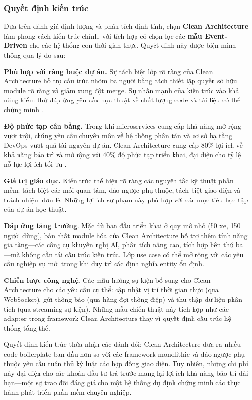 \subsubsection{Quyết định kiến trúc}

Dựa trên đánh giá định lượng và phân tích định tính, chọn \textbf{Clean Architecture} làm phong cách kiến trúc chính, với tích hợp có chọn lọc các \textbf{mẫu Event-Driven} cho các hệ thống con thời gian thực. Quyết định này được biện minh thông qua lý do sau:

\textbf{Phù hợp với ràng buộc dự án.} Sự tách biệt lớp rõ ràng của Clean Architecture hỗ trợ cấu trúc nhóm ba người bằng cách thiết lập quyền sở hữu module rõ ràng và giảm xung đột merge. Sự nhấn mạnh của kiến trúc vào khả năng kiểm thử đáp ứng yêu cầu học thuật về chất lượng code và tài liệu có thể chứng minh \cite{martin2017}.

\textbf{Độ phức tạp cân bằng.} Trong khi microservices cung cấp khả năng mở rộng vượt trội, chúng yêu cầu chuyên môn về hệ thống phân tán và cơ sở hạ tầng DevOps vượt quá tài nguyên dự án. Clean Architecture cung cấp 80\% lợi ích về khả năng bảo trì và mở rộng với 40\% độ phức tạp triển khai, đại diện cho tỷ lệ nỗ lực-lợi ích tối ưu \cite{richards2020}.

\textbf{Giá trị giáo dục.} Kiến trúc thể hiện rõ ràng các nguyên tắc kỹ thuật phần mềm: tách biệt các mối quan tâm, đảo ngược phụ thuộc, tách biệt giao diện và trách nhiệm đơn lẻ. Những lợi ích sư phạm này phù hợp với các mục tiêu học tập của dự án học thuật.

\textbf{Đáp ứng tăng trưởng.} Mặc dù ban đầu triển khai ở quy mô nhỏ (50 xe, 150 người dùng), bản chất module hóa của Clean Architecture hỗ trợ thêm tính năng gia tăng—các công cụ khuyến nghị AI, phân tích nâng cao, tích hợp bên thứ ba—mà không cần tái cấu trúc kiến trúc. Lớp use case có thể mở rộng với các yêu cầu nghiệp vụ mới trong khi duy trì các định nghĩa entity ổn định.

\textbf{Chiến lược công nghệ.} Các mẫu hướng sự kiện bổ sung cho Clean Architecture cho các yêu cầu cụ thể: cập nhật vị trí thời gian thực (qua WebSocket), gửi thông báo (qua hàng đợi thông điệp) và thu thập dữ liệu phân tích (qua streaming sự kiện). Những mẫu chiến thuật này tích hợp như các adapter trong framework Clean Architecture thay vì quyết định cấu trúc hệ thống tổng thể.

Quyết định kiến trúc thừa nhận các đánh đổi: Clean Architecture đưa ra nhiều code boilerplate ban đầu hơn so với các framework monolithic và đảo ngược phụ thuộc yêu cầu tuân thủ kỷ luật các hợp đồng giao diện. Tuy nhiên, những chi phí này đại diện cho các khoản đầu tư trả trước mang lại lợi ích khả năng bảo trì dài hạn—một sự trao đổi đáng giá cho một hệ thống dự định chứng minh các thực hành phát triển phần mềm chuyên nghiệp.